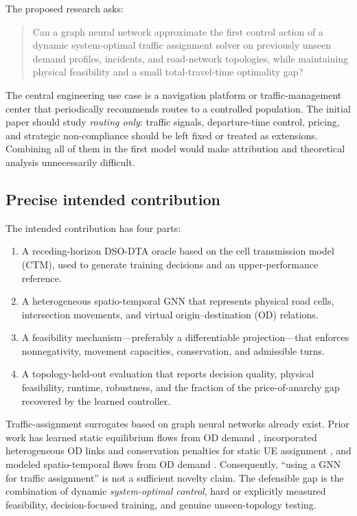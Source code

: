 \documentclass[11pt]{article}
\begin{document}
The proposed research asks:

\begin{quote}
Can a graph neural network approximate the first control action of a dynamic
system-optimal traffic assignment solver on previously unseen demand profiles,
incidents, and road-network topologies, while maintaining physical feasibility and a
small total-travel-time optimality gap?
\end{quote}

The central engineering use case is a navigation platform or traffic-management center
that periodically recommends routes to a controlled population.  The initial paper
should study \emph{routing only}: traffic signals, departure-time control, pricing,
and strategic non-compliance should be left fixed or treated as extensions.  Combining
all of them in the first model would make attribution and theoretical analysis
unnecessarily difficult.

\subsection{Precise intended contribution}

The intended contribution has four parts:

\begin{enumerate}[label=\textbf{C\arabic*:},leftmargin=2.8em]
  \item A receding-horizon DSO-DTA oracle based on the cell transmission model (CTM),
  used to generate training decisions and an upper-performance reference.
  \item A heterogeneous spatio-temporal GNN that represents physical road cells,
  intersection movements, and virtual origin--destination (OD) relations.
  \item A feasibility mechanism---preferably a differentiable projection---that
  enforces nonnegativity, movement capacities, conservation, and admissible turns.
  \item A topology-held-out evaluation that reports decision quality, physical
  feasibility, runtime, robustness, and the fraction of the price-of-anarchy gap
  recovered by the learned controller.
\end{enumerate}

Traffic-assignment surrogates based on graph neural networks already exist.
Prior work has learned static equilibrium flows from OD demand \citep{rahman2023},
incorporated heterogeneous OD links and conservation penalties for static UE
assignment \citep{liu2024hetgat}, and modeled spatio-temporal flows from OD demand
\citep{liu2024hstgsn}.  Consequently, ``using a GNN for traffic assignment'' is not a
sufficient novelty claim.  The defensible gap is the combination of dynamic
\emph{system-optimal control}, hard or explicitly measured feasibility, decision-focused
training, and genuine unseen-topology testing.
\end{document}
